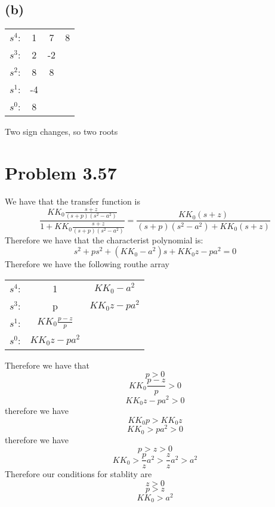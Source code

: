 \documentclass[12pt]{article}
\begin{document}
\subsection*{(b)}
\begin{center}
    \begin{tabular}{ c c c c} 
     $s^4$: & 1 & 7 & 8\\ 
     $s^3$: & 2 & -2&  \\ 
     $s^2$: & 8 & 8&\\
     $s^1$:  & -4 & &\\
     $s^0$: & 8 & &
\end{tabular} 
\end{center}
Two sign changes, so two roots
\section*{Problem 3.57}
We have that the transfer function is 
$$\frac{KK_0\frac{s+z}{(s+p)(s^2-a^2)}}{1+KK_0\frac{s+z}{(s+p)(s^2-a^2)}}=
\frac{KK_0(s+z)}{(s+p)(s^2-a^2)+KK_0(s+z)}$$
Therefore we have that the characterist polynomial is:
 $$s^2+ps^2+(KK_0-a^2)s+KK_0z-pa^2=0$$
Therefore we have the following routhe array
\begin{center}
    \begin{tabular}{ c c c} 
     $s^4$: & 1 & $KK_0-a^2$\\ 
     $s^3$: & p & $KK_0z-pa^2$ \\
     $s^1$: & $KK_0\frac{p-z}{p}$&\\
     $s^0$: & $KK_0z-pa^2$
    \end{tabular}
    \end{center}
Therefore we have that 
$$p>0$$
$$KK_0\frac{p-z}{p}>0$$
$$KK_0z-pa^2>0$$
therefore we have
$$KK_0p>KK_0z$$
$$KK_0>pa^2>0$$
therefore we have
$$p>z>0$$
$$KK_0>\frac{p}{z}a^2>\frac{z}{z}a^2>a^2$$
Therefore our conditions for stablity are 
$$z>0$$
$$p>z$$
$$KK_0>a^2$$


    
\end{document}
